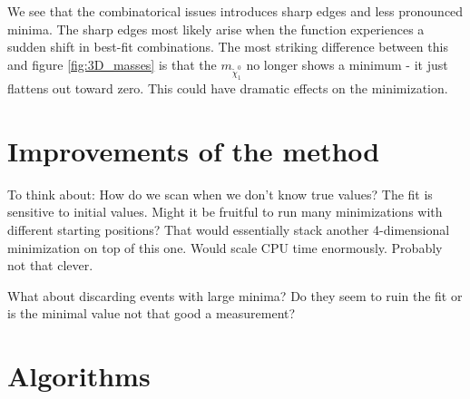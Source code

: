 \documentclass[twoside,english]{uiofysmaster}
\begin{document}
We see that the combinatorical issues introduces sharp edges and less pronounced minima. The sharp edges most likely arise when the function experiences a sudden shift in best-fit combinations. The most striking difference between this and figure \ref{fig:3D_masses} is that the $m_{\tilde \chi_1^0}$ no longer shows a minimum - it just flattens out toward zero. This could have dramatic effects on the minimization. 






\chapter{Improvements of the method}
To think about: How do we scan when we don't know true values? The fit is sensitive to initial values. Might it be fruitful to run many minimizations with different starting positions? That would essentially stack another 4-dimensional minimization on top of this one. Would scale CPU time enormously. Probably not that clever.

What about discarding events with large minima? Do they seem to ruin the fit or is the minimal value not that good a measurement?




\appendix

\chapter{Algorithms}
\end{document}
